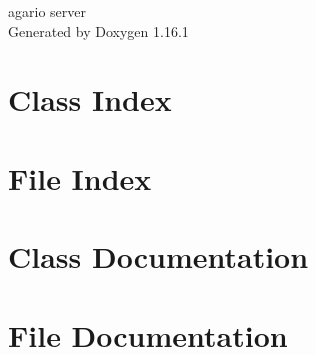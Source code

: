 \documentclass[twoside]{book}
\newcommand{\+}{\discretionary{\mbox{\scriptsize$\hookleftarrow$}}{}{}}
\newcommand{\clearemptydoublepage}{%
    \newpage{\pagestyle{empty}\cleardoublepage}%
  }
\begin{document}
  \raggedbottom
    \hypersetup{pageanchor=false,
                bookmarksnumbered=true,
                pdfencoding=unicode
               }
  \begin{titlepage}
  \vspace*{7cm}
  \begin{center}%
  {\Large agario server}\\
  \vspace*{1cm}
  {\large Generated by Doxygen 1.16.1}\\
  \end{center}
  \end{titlepage}
  \clearemptydoublepage
  \tableofcontents
  \clearemptydoublepage
  \hypersetup{pageanchor=true}
\chapter{Class Index}

\chapter{File Index}

\chapter{Class Documentation}








\chapter{File Documentation}





  \backmatter
  \newpage
  \clearemptydoublepage
  \printindex
\end{document}
